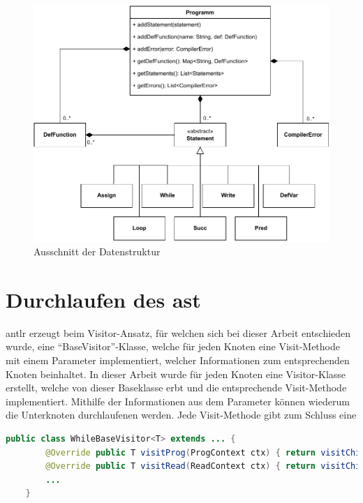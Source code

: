 \begin{figure}[h!]
	\centering
	\includegraphics[width=13cm]{content/pictures/ClassDia.pdf}
	\caption{Ausschnitt der Datenstruktur}
	\label{pic:Semantic-Struct}
\end{figure}

\section{Durchlaufen des \acl{ast}}
\ac{antlr} erzeugt beim Visitor-Ansatz, für welchen sich bei dieser Arbeit entschieden wurde, eine \enquote{BaseVisitor}-Klasse, welche für jeden Knoten eine Visit-Methode mit einem Parameter implementiert, welcher Informationen zum entsprechenden Knoten beinhaltet. In dieser Arbeit wurde für jeden Knoten eine Visitor-Klasse erstellt, welche von dieser Baseklasse erbt und die entsprechende Visit-Methode implementiert. Mithilfe der Informationen aus dem Parameter können wiederum die Unterknoten durchlaufenen werden. Jede Visit-Methode gibt zum Schluss eine 

\begin{lstlisting}[language=java, caption=Inhalt der generierten BaseVisitor-Klasse, label={lst:parser-basevisitor}]
	public class WhileBaseVisitor<T> extends ... {
		@Override public T visitProg(ProgContext ctx) { return visitChildren(ctx); }
		@Override public T visitRead(ReadContext ctx) { return visitChildren(ctx); }
		...
	}
\end{lstlisting}